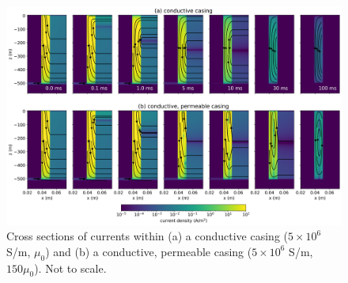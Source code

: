 \begin{figure}
    \begin{center}
    \includegraphics[width=1\textwidth]{figures/tdem-casing-currents.png}
    \end{center}
\caption{Cross sections of currents within (a) a conductive casing ($5\times10^6$ S/m, $\mu_0$) and (b) a conductive, permeable casing ($5\times10^6$ S/m, $150\mu_0$). Not to scale.
}
\label{fig:tdem-casing-currents}
\end{figure}



